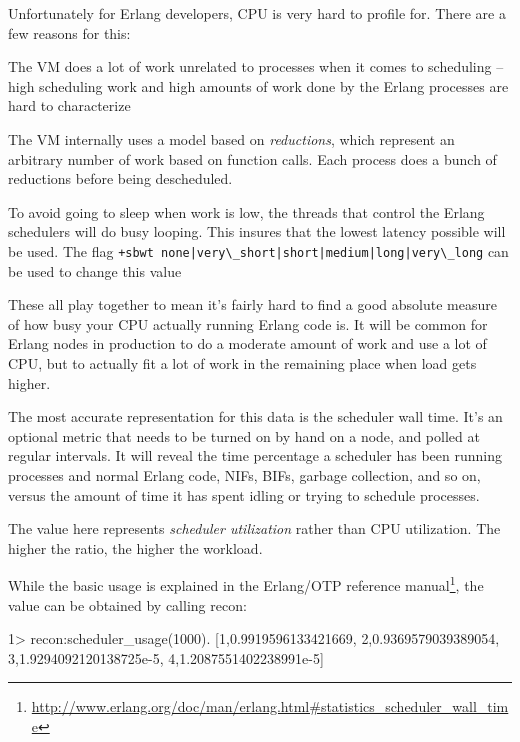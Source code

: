 \documentclass[11pt, oneside]{book}   	%
\newcommand{\command}[1]{\Verb`#1`}
\begin{document}
Unfortunately for Erlang developers, CPU is very hard to profile for. There are a few reasons for this:

\begin{itemize*}
	\item The VM does a lot of work unrelated to processes when it comes to scheduling -- high scheduling work and high amounts of work done by the Erlang processes are hard to characterize
	\item The VM internally uses a model based on \emph{reductions}, which represent an arbitrary number of work based on function calls. Each process does a bunch of reductions before being descheduled.
	\item To avoid going to sleep when work is low, the threads that control the Erlang schedulers will do busy looping. This insures that the lowest latency possible will be used. The flag \command{+sbwt none|very\_short|short|medium|long|very\_long} can be used to change this value
\end{itemize*}

These all play together to mean it's fairly hard to find a good absolute measure of how busy your CPU actually running Erlang code is. It will be common for Erlang nodes in production to do a moderate amount of work and use a lot of CPU, but to actually fit a lot of work in the remaining place when load gets higher.

The most accurate representation for this data is the scheduler wall time. It's an optional metric that needs to be turned on by hand on a node, and polled at regular intervals. It will reveal the time percentage a scheduler has been running processes and normal Erlang code, NIFs, BIFs, garbage collection, and so on, versus the amount of time it has spent idling or trying to schedule processes.

The value here represents \emph{scheduler utilization} rather than CPU utilization. The higher the ratio, the higher the workload.

While the basic usage is explained in the Erlang/OTP reference manual\footnote{\href{http://www.erlang.org/doc/man/erlang.html\#statistics\_scheduler\_wall\_time}{http://www.erlang.org/doc/man/erlang.html\#statistics\_scheduler\_wall\_time}}, the value can be obtained by calling recon:

\begin{VerbatimEshell}
1> recon:scheduler_usage(1000).
[{1,0.9919596133421669},
 {2,0.9369579039389054},
 {3,1.9294092120138725e-5},
 {4,1.2087551402238991e-5}]
\end{VerbatimEshell}
\end{document}
